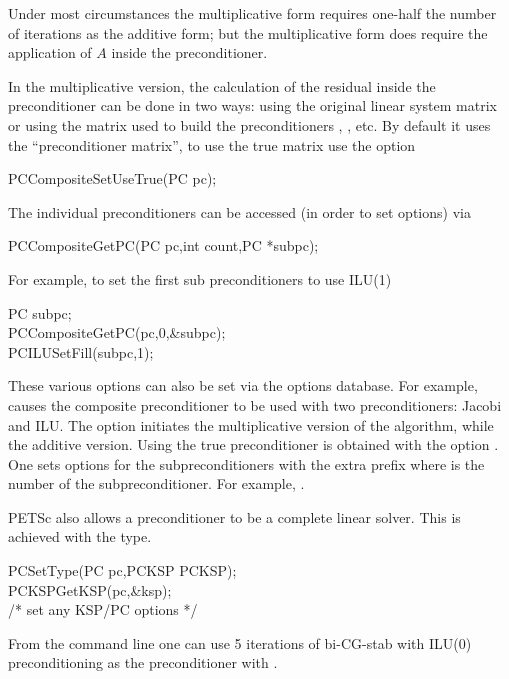 Under most circumstances the multiplicative form requires one-half the number of
iterations as the additive form; but the multiplicative form does require 
the application of $ A $ inside the preconditioner. 

In the multiplicative version, the calculation of the residual inside the 
preconditioner can be done in two ways: using the original linear system matrix
or using the matrix used to build the preconditioners , , etc.
By default it uses the ``preconditioner matrix'', to use the true matrix use the 
option 
\begin{tabbing}
  PCCompositeSetUseTrue(PC pc);
\end{tabbing}

The individual 
preconditioners can be accessed (in order to set options) via
\begin{tabbing}
  PCCompositeGetPC(PC pc,int count,PC *subpc);
\end{tabbing}
For example, to set the first sub preconditioners to use ILU(1)
\begin{tabbing}
   PC subpc;\\
  PCCompositeGetPC(pc,0,\&subpc);\\
  PCILUSetFill(subpc,1);
\end{tabbing}

These various options can also be set via the options database. For example,
    
 causes the composite preconditioner to be used with 
two preconditioners: Jacobi and ILU. The option  
 initiates the multiplicative version of the algorithm,
while   the additive version. Using the true
preconditioner is obtained with the option . 
 One sets options for the subpreconditioners with the 
extra prefix  where  is the number of the subpreconditioner.
For example,  .


PETSc also allows a preconditioner to be a complete linear solver. This is 
achieved with the  type. 
\begin{tabbing}
  PCSetType(PC pc,PCKSP PCKSP);\\
  PCKSPGetKSP(pc,\&ksp);\\
   /* set any KSP/PC options */
\end{tabbing}
 From the command line one can use 5 iterations of 
bi-CG-stab with ILU(0) preconditioning as the preconditioner with 
. 

